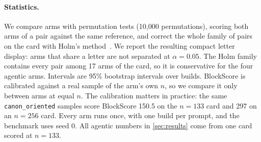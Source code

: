 \paragraph{Statistics.}
We compare arms with permutation tests (10{,}000 permutations), scoring both arms of a pair against the same reference, and correct the whole family of pairs on the card with Holm's method~\citep{holm1979simple}. %
We report the resulting compact letter display: arms that share a letter are not separated at $\alpha{=}0.05$. %
The Holm family contains every pair among 17 arms of the card, so it is conservative for the four agentic arms. %
Intervals are 95\% bootstrap intervals over builds. %
BlockScore is calibrated against a real sample of the arm's own $n$, so we compare it only between arms at equal $n$. %
The calibration matters in practice: the same \texttt{canon\_oriented} samples score BlockScore 150.5 on the $n{=}133$ card and 297 on an $n{=}256$ card. %
Every arm runs once, with one build per prompt, and the benchmark uses seed 0. %
All agentic numbers in \cref{sec:results} come from one card scored at $n{=}133$. %
